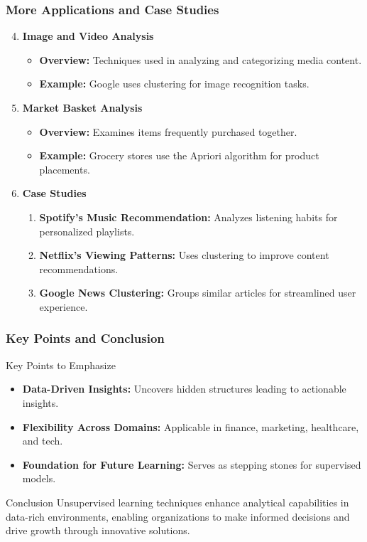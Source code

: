 \documentclass[aspectratio=169]{beamer}
\begin{document}
\begin{frame}[fragile]
    \frametitle{More Applications and Case Studies}
    \begin{enumerate}
        \setcounter{enumi}{3}
        \item \textbf{Image and Video Analysis}
            \begin{itemize}
                \item \textbf{Overview:} Techniques used in analyzing and categorizing media content.
                \item \textbf{Example:} Google uses clustering for image recognition tasks.
            \end{itemize}
        
        \item \textbf{Market Basket Analysis}
            \begin{itemize}
                \item \textbf{Overview:} Examines items frequently purchased together.
                \item \textbf{Example:} Grocery stores use the Apriori algorithm for product placements.
            \end{itemize}
        
        \item \textbf{Case Studies}
            \begin{enumerate}
                \item \textbf{Spotify's Music Recommendation:} Analyzes listening habits for personalized playlists.
                \item \textbf{Netflix's Viewing Patterns:} Uses clustering to improve content recommendations.
                \item \textbf{Google News Clustering:} Groups similar articles for streamlined user experience.
            \end{enumerate}
    \end{enumerate}
\end{frame}

\begin{frame}[fragile]
    \frametitle{Key Points and Conclusion}
    \begin{block}{Key Points to Emphasize}
        \begin{itemize}
            \item \textbf{Data-Driven Insights:} Uncovers hidden structures leading to actionable insights.
            \item \textbf{Flexibility Across Domains:} Applicable in finance, marketing, healthcare, and tech.
            \item \textbf{Foundation for Future Learning:} Serves as stepping stones for supervised models.
        \end{itemize}
    \end{block}

    \begin{block}{Conclusion}
        Unsupervised learning techniques enhance analytical capabilities in data-rich environments, enabling organizations to make informed decisions and drive growth through innovative solutions.
    \end{block}
\end{frame}
\end{document}
